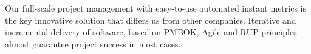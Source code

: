 Our full-scale project management with easy-to-use automated
instant metrics is the key innovative solution that differs us
from other companies. Iterative and incremental delivery of software,
based on PMBOK, Agile and RUP principles almost guarantee project success
in most cases.
